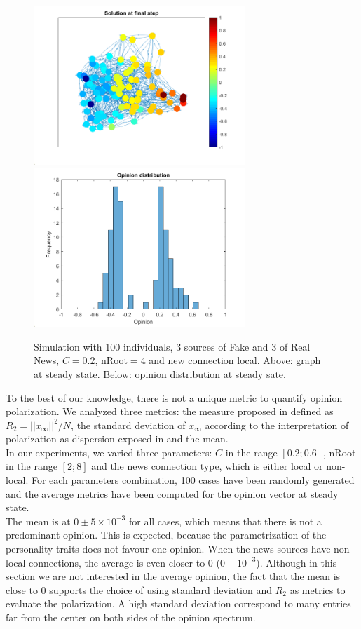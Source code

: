 \begin{figure}[!t]
\centering
\includegraphics[width=8cm]{Figures/Exp20_graphc.png}
\includegraphics[width=8cm]{Figures/Exp20_hystc.png}
\caption{Simulation with 100 individuals, 3 sources of Fake and 3 of Real News, $C=0.2$, nRoot$=4$ and new connection local. Above: graph at steady state. Below: opinion distribution at steady sate.}
\label{pics:exp20}
\end{figure}

To the best of our knowledge, there is not a unique metric to quantify opinion polarization. We analyzed three metrics: the measure proposed in \cite{Matakos2017} defined as $R_2 = ||x_{\infty}||^2/ N$, the standard deviation of $x_{\infty}$ according to the interpretation of polarization as dispersion exposed in \cite{Bramsona2016} and the mean.\\

In our experiments, we varied three parameters: $C$ in the range $[0.2; 0.6]$, nRoot in the range $[2; 8]$ and the news connection type, which is either local or non-local. For each parameters combination, 100 cases have been randomly generated and the average metrics have been computed for the opinion vector at steady state.\\

The mean is at  $0 \pm 5\times 10^{-3}$ for all cases, which means that there is not a predominant opinion. This is expected, because the parametrization of the personality traits does not favour one opinion. When the news sources have non-local connections, the average is even closer to 0 ($0 \pm 10^{-3}$). Although in this section we are not interested in the average opinion, the fact that the mean is close to 0 supports the choice of using standard deviation and $R_2$ as metrics to evaluate the polarization. A high standard deviation correspond to many entries far from the center on both sides of the opinion spectrum.\\

